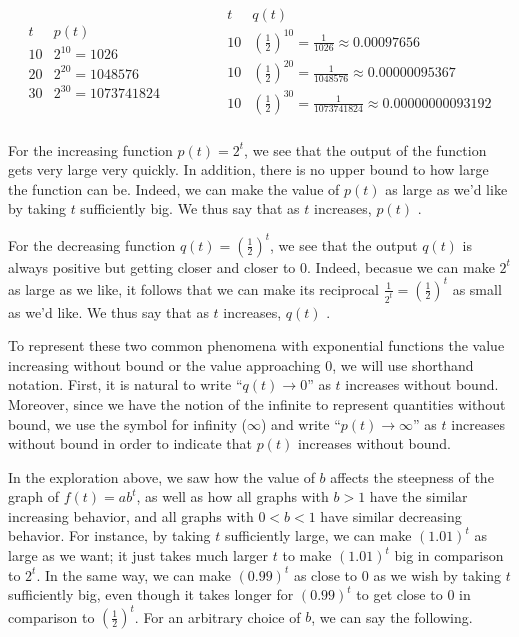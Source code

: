 \documentclass[nooutcomes]{ximera}
\begin{document}
\[
\begin{array}{cccccc}
{\begin{array}{cc}
t&p(t)\\
\hline
10&2^10=1026\\
20&2^20=1048576\\
30&2^30=1073741824
\end{array}}&&&&&
{\begin{array}{cc}
t&q(t)\\
\hline
10&\left(\frac{1}{2}\right)^10=\frac{1}{1026} \approx 0.00097656\\
10&\left(\frac{1}{2}\right)^20=\frac{1}{1048576} \approx 0.00000095367\\
10&\left(\frac{1}{2}\right)^30=\frac{1}{1073741824} \approx 0.00000000093192
\end{array}}\\
\end{array}
\]

For the increasing function \(p(t) = 2^t\), we see that the output of the function gets very large very quickly.  In addition, there is no upper bound to how large the function can be.  Indeed, we can make the value of \(p(t)\) as large as we'd like by taking \(t\) sufficiently big.  We thus say that as \(t\) increases, \(p(t)\) .

For the decreasing function \(q(t) = (\frac{1}{2})^t\), we see that the output \(q(t)\) is always positive but getting closer and closer to \(0\).  Indeed, becasue we can make \(2^t\) as large as we like, it follows that we can make its reciprocal \(\frac{1}{2^t} = (\frac{1}{2})^t\) as small as we'd like.  We thus say that as \(t\) increases, \(q(t)\) . 

To represent these two common phenomena with exponential functions the value increasing without bound or the value approaching \(0\), we will use shorthand notation.  First, it is natural to write ``\(q(t) \to 0\)'' as \(t\) increases without bound.  Moreover, since we have the notion of the infinite to represent quantities without bound, we use the symbol for infinity  (\(\infty\)) and write ``\(p(t) \to \infty\)'' as \(t\) increases without bound in order to indicate that \(p(t)\) increases without bound.

In the exploration above, we saw how the value of \(b\) affects the steepness of the graph of \(f(t) = ab^t\), as well as how all graphs with \(b \gt 1\) have the similar increasing behavior, and all graphs with \(0 \lt b \lt 1\) have similar decreasing behavior.  For instance, by taking \(t\) sufficiently large, we can make \((1.01)^t\) as large as we want; it just takes much larger \(t\) to make \((1.01)^t\) big in comparison to \(2^t\).  In the same way, we can make \((0.99)^t\) as close to \(0\) as we wish by taking \(t\) sufficiently big, even though it takes longer for \((0.99)^t\) to get close to \(0\) in comparison to \((\frac{1}{2})^t\).  For an arbitrary choice of \(b\), we can say the following.
\end{document}
